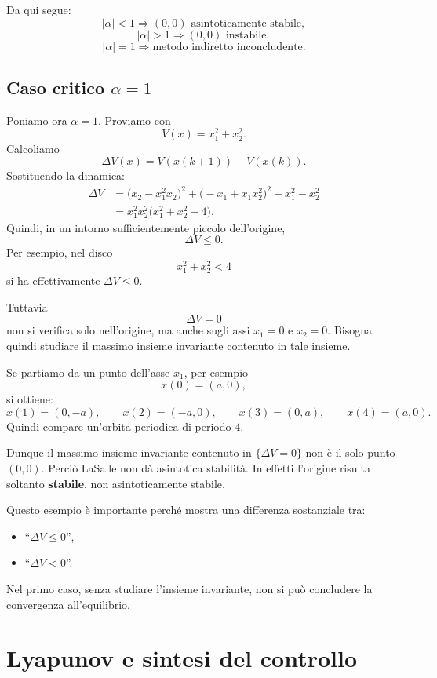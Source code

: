 Da qui segue:
\[
|\alpha|<1 \Rightarrow (0,0)\text{ asintoticamente stabile},
\]
\[
|\alpha|>1 \Rightarrow (0,0)\text{ instabile},
\]
\[
|\alpha|=1 \Rightarrow \text{metodo indiretto inconcludente}.
\]

\subsection{Caso critico \(\alpha=1\)}

Poniamo ora \(\alpha=1\).  
Proviamo con
\[
V(x)=x_1^2+x_2^2.
\]
Calcoliamo
\[
\Delta V(x)=V(x(k+1))-V(x(k)).
\]
Sostituendo la dinamica:
\begin{align*}
\Delta V
&=
\bigl(x_2-x_1^2x_2\bigr)^2+\bigl(-x_1+x_1x_2^2\bigr)^2-x_1^2-x_2^2\\
&=
x_1^2x_2^2\bigl(x_1^2+x_2^2-4\bigr).
\end{align*}
Quindi, in un intorno sufficientemente piccolo dell'origine,
\[
\Delta V \le 0.
\]
Per esempio, nel disco
\[
x_1^2+x_2^2<4
\]
si ha effettivamente \(\Delta V\le 0\).

Tuttavia
\[
\Delta V=0
\]
non si verifica solo nell'origine, ma anche sugli assi \(x_1=0\) e \(x_2=0\). Bisogna quindi studiare il massimo insieme invariante contenuto in tale insieme.

Se partiamo da un punto dell'asse \(x_1\), per esempio
\[
x(0)=(a,0),
\]
si ottiene:
\[
x(1)=(0,-a),
\qquad
x(2)=(-a,0),
\qquad
x(3)=(0,a),
\qquad
x(4)=(a,0).
\]
Quindi compare un'orbita periodica di periodo \(4\).

Dunque il massimo insieme invariante contenuto in \(\{\Delta V=0\}\) non è il solo punto \((0,0)\).  
Perciò LaSalle non dà asintotica stabilità. In effetti l'origine risulta soltanto \textbf{stabile}, non asintoticamente stabile.

\medskip

\noindent
Questo esempio è importante perché mostra una differenza sostanziale tra:
\begin{itemize}
    \item ``\(\Delta V\le 0\)'',
    \item ``\(\Delta V<0\)''.
\end{itemize}
Nel primo caso, senza studiare l'insieme invariante, non si può concludere la convergenza all'equilibrio.

\section{Lyapunov e sintesi del controllo}

